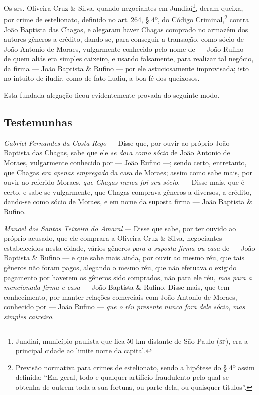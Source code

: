 \asterisc{}

Os srs. Oliveira Cruz \& Silva, quando negociantes em
Jundiaí\footnote{ Jundiaí, município paulista que fica 50 km distante
  de São Paulo (\textsc{sp}), era a principal cidade ao limite norte da capital.},
deram queixa, por crime de estelionato, definido no art. 264, § 4º, do
Código Criminal,\footnote{ Previsão normativa para crimes de
  estelionato, sendo a hipótese do § 4º assim definida: ``Em geral, todo
  e qualquer artifício fraudulento pelo qual se obtenha de outrem toda a
  sua fortuna, ou parte dela, ou quaisquer títulos''.} contra João
Baptista das Chagas, e alegaram haver Chagas comprado no armazém dos
autores gêneros a crédito, dando-se, para conseguir a transação, como
sócio de João Antonio de Moraes, vulgarmente conhecido pelo nome de ---
João Rufino --- de quem aliás era simples caixeiro, e usando falsamente,
para realizar tal negócio, da firma --- João Baptista \& Rufino --- por
ele astuciosamente improvisada; isto no intuito de iludir, como de fato
iludiu, a boa fé dos queixosos.

Esta fundada alegação ficou evidentemente provada do seguinte modo.

\subsection{Testemunhas}

\emph{Gabriel Fernandes da Costa Rego} --- Disse que, por ouvir ao
próprio João Baptista das Chagas, sabe que ele \emph{se dava como sócio}
de João Antonio de Moraes, vulgarmente conhecido por --- João Rufino ---;
sendo certo, entretanto, que Chagas \emph{era apenas empregado} da casa
de Moraes; assim como sabe mais, por ouvir ao referido Moraes, \emph{que
Chagas nunca foi seu sócio}. --- Disse mais, que é certo, e sabe-se
vulgarmente, que Chagas comprava gêneros a diversos, a crédito, dando-se
como sócio de Moraes, e em nome da suposta firma --- João Baptista \&
Rufino.

\emph{Manoel dos Santos Teixeira do Amaral} --- Disse que sabe, por ter
ouvido ao próprio acusado, que ele comprara a Oliveira Cruz \& Silva,
negociantes estabelecidos nesta cidade, vários gêneros \emph{para a
suposta firma ou casa} de --- João Baptista \& Rufino --- e que sabe mais
ainda, por ouvir ao mesmo réu, que tais gêneros não foram pagos,
alegando o mesmo réu, que não efetuava o exigido pagamento por haverem
os gêneros sido comprados, não para ele réu, \emph{mas para a mencionada
firma e casa} --- João Baptista \& Rufino. Disse mais, que tem
conhecimento, por manter relações comerciais com João Antonio de Moraes,
conhecido por --- João Rufino --- \emph{que o réu presente nunca fora dele
sócio}, \emph{mas simples caixeiro}.

